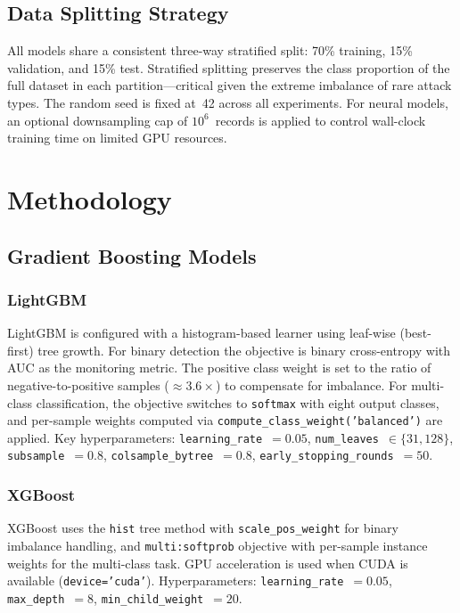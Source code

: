 \documentclass[conference]{IEEEtran}
\begin{document}
\subsection{Data Splitting Strategy}

All models share a consistent three-way stratified split: 70\% training,
15\% validation, and 15\% test.  Stratified splitting preserves the class
proportion of the full dataset in each partition—critical given the extreme
imbalance of rare attack types.  The random seed is fixed at~42 across all
experiments.  For neural models, an optional downsampling cap of
$10^{6}$~records is applied to control wall-clock training time on limited
GPU resources.

\section{Methodology}

\subsection{Gradient Boosting Models}

\subsubsection{LightGBM}
LightGBM is configured with a histogram-based learner using leaf-wise
(best-first) tree growth.  For binary detection the objective is binary
cross-entropy with AUC as the monitoring metric.  The positive class weight
is set to the ratio of negative-to-positive samples ($\approx3.6\times$) to
compensate for imbalance.  For multi-class classification, the objective
switches to \texttt{softmax} with eight output classes, and per-sample weights
computed via \texttt{compute\_class\_weight('balanced')} are applied.
Key hyperparameters: \texttt{learning\_rate}~$=0.05$,
\texttt{num\_leaves}~$\in\{31,128\}$, \texttt{subsample}~$=0.8$,
\texttt{colsample\_bytree}~$=0.8$, \texttt{early\_stopping\_rounds}~$=50$.

\subsubsection{XGBoost}
XGBoost uses the \texttt{hist} tree method with \texttt{scale\_pos\_weight}
for binary imbalance handling, and \texttt{multi:softprob} objective with
per-sample instance weights for the multi-class task.  GPU acceleration is
used when CUDA is available (\texttt{device='cuda'}).  Hyperparameters:
\texttt{learning\_rate}~$=0.05$, \texttt{max\_depth}~$=8$,
\texttt{min\_child\_weight}~$=20$.
\end{document}

